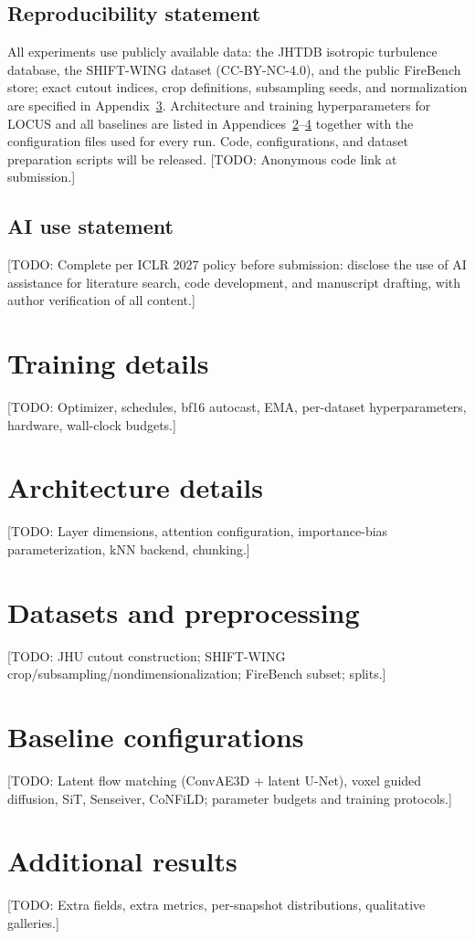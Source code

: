 \documentclass{article} %
\newcommand{\todo}[1]{{\color{red}[TODO: #1]}}
\newcommand{\model}{LOCUS}
\begin{document}
\subsection*{Reproducibility statement}
All experiments use publicly available data: the JHTDB isotropic turbulence database, the SHIFT-WING dataset (CC-BY-NC-4.0), and the public FireBench store; exact cutout indices, crop definitions, subsampling seeds, and normalization are specified in Appendix~\ref{app:datasets}. Architecture and training hyperparameters for \model{} and all baselines are listed in Appendices~\ref{app:architecture}--\ref{app:baselines} together with the configuration files used for every run. Code, configurations, and dataset preparation scripts will be released. \todo{Anonymous code link at submission.}

\subsection*{AI use statement}
\todo{Complete per ICLR 2027 policy before submission: disclose the use of AI assistance for literature search, code development, and manuscript drafting, with author verification of all content.}




\appendix
\section{Training details}
\label{app:training}
\todo{Optimizer, schedules, bf16 autocast, EMA, per-dataset hyperparameters, hardware, wall-clock budgets.}

\section{Architecture details}
\label{app:architecture}
\todo{Layer dimensions, attention configuration, importance-bias parameterization, kNN backend, chunking.}

\section{Datasets and preprocessing}
\label{app:datasets}
\todo{JHU cutout construction; SHIFT-WING crop/subsampling/nondimensionalization; FireBench subset; splits.}

\section{Baseline configurations}
\label{app:baselines}
\todo{Latent flow matching (ConvAE3D + latent U-Net), voxel guided diffusion, SiT, Senseiver, CoNFiLD; parameter budgets and training protocols.}

\section{Additional results}
\label{app:results}
\todo{Extra fields, extra metrics, per-snapshot distributions, qualitative galleries.}
\end{document}
